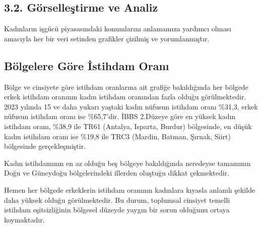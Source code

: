 \documentclass[
  11pt,
  a4paper,
  DIV=11,
  numbers=noendperiod]{scrartcl}
\begin{document}
\subsection{3.2. Görselleştirme ve
Analiz}\label{guxf6rselleux15ftirme-ve-analiz}

Kadınların işgücü piyasasındaki konumlarını anlamamıza yardımcı olması
amacıyla her bir veri setinden grafikler çizilmiş ve yorumlanmıştır.

\subsection{Bölgelere Göre İstihdam
Oranı}\label{buxf6lgelere-guxf6re-istihdam-oranux131}

Bölge ve cinsiyete göre istihdam oranlarına ait grafiğe bakıldığında her
bölgede erkek istihdam oranının kadın istihdam oranından fazla olduğu
görülmektedir. 2023 yılında 15 ve daha yukarı yaştaki kadın nüfusun
istihdam oranı \%31,3, erkek nüfusun istihdam oranı ise \%65,7'dir. İBBS
2.Düzeye göre en yüksek kadın istihdam oranı, \%38,9 ile TR61 (Antalya,
Isparta, Burdur) bölgesinde, en düşük kadın istihdam oranı ise \%19,8
ile TRC3 (Mardin, Batman, Şırnak, Siirt) bölgesinde gerçekleşmiştir.

Kadın istihdamının en az olduğu beş bölgeye bakıldığında neredeyse
tamamının Doğu ve Güneydoğu bölgelerindeki illerden oluştuğu dikkat
çekmektedir.

Hemen her bölgede erkeklerin istihdam oranının kadınlara kıyasla anlamlı
şekilde daha yüksek olduğu görülmektedir. Bu durum, toplumsal cinsiyet
temelli istihdam eşitsizliğinin bölgesel düzeyde yaygın bir sorun
olduğunu ortaya koymaktadır.
\end{document}
